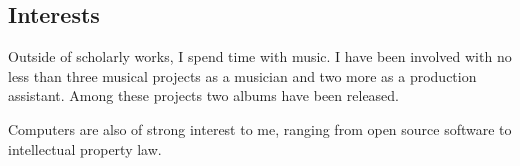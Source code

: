 \documentclass[margintitle,line]{res}
\begin{document}
\begin{resume}

\section{Interests}

Outside of scholarly works, I spend time with music. I have been involved with no less than three musical projects as a musician and two more as a production assistant. Among these projects two albums have been released. 

Computers are also of strong interest to me, ranging from open source software to intellectual property law.





\end{resume}
\end{document}
